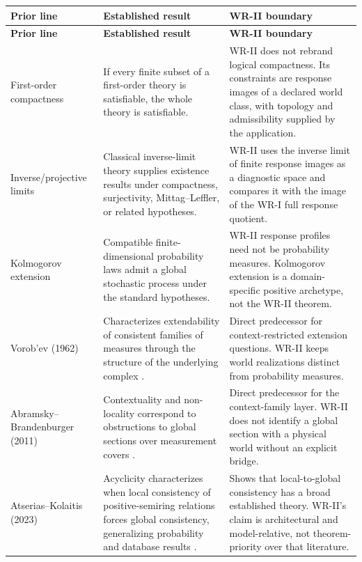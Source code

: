 \documentclass[11pt]{article}
\begin{document}
\begin{longtable}{>{\raggedright\arraybackslash}p{}
                  >{\raggedright\arraybackslash}p{}
                  >{\raggedright\arraybackslash}p{}}
\toprule
\textbf{Prior line} & \textbf{Established result} & \textbf{WR-II boundary}\\
\midrule
\endfirsthead
\toprule
\textbf{Prior line} & \textbf{Established result} & \textbf{WR-II boundary}\\
\midrule
\endhead

First-order compactness &
If every finite subset of a first-order theory is satisfiable, the whole theory
is satisfiable. &
WR-II does not rebrand logical compactness. Its constraints are response images
of a declared world class, with topology and admissibility supplied by the
application. \\[5pt]

Inverse/projective limits &
Classical inverse-limit theory supplies existence results under compactness,
surjectivity, Mittag--Leffler, or related hypotheses. &
WR-II uses the inverse limit of finite response images as a diagnostic space and
compares it with the image of the WR-I full response quotient. \\[5pt]

Kolmogorov extension &
Compatible finite-dimensional probability laws admit a global stochastic
process under the standard hypotheses. &
WR-II response profiles need not be probability measures. Kolmogorov extension
is a domain-specific positive archetype, not the WR-II theorem. \\[5pt]

Vorob'ev (1962) &
Characterizes extendability of consistent families of measures through the
structure of the underlying complex \cite{Vorobev1962}. &
Direct predecessor for context-restricted extension questions. WR-II keeps
world realizations distinct from probability measures. \\[5pt]

Abramsky--Brandenburger (2011) &
Contextuality and non-locality correspond to obstructions to global sections
over measurement covers \cite{AbramskyBrandenburger2011}. &
Direct predecessor for the context-family layer. WR-II does not identify a
global section with a physical world without an explicit bridge. \\[5pt]

Atserias--Kolaitis (2023) &
Acyclicity characterizes when local consistency of positive-semiring relations
forces global consistency, generalizing probability and database results
\cite{AtseriasKolaitis2023}. &
Shows that local-to-global consistency has a broad established theory. WR-II's
claim is architectural and model-relative, not theorem-priority over that
literature. \\[5pt]


\end{longtable}
\end{document}
